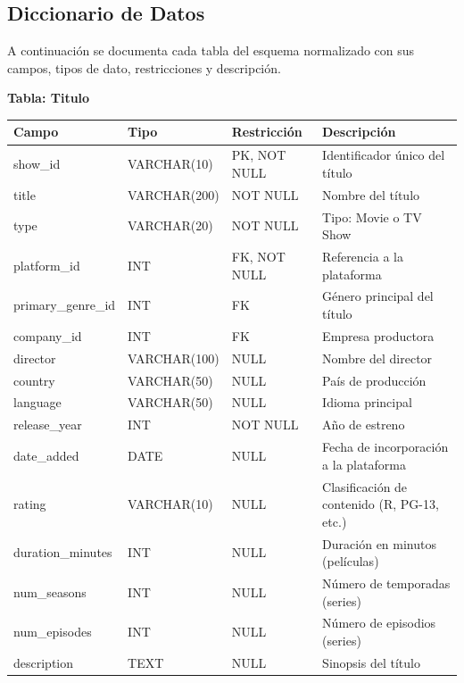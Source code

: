 \documentclass[12pt,a4paper]{article}
\begin{document}
\newpage
\subsection*{Diccionario de Datos}

A continuaci\'on se documenta cada tabla del esquema normalizado con sus campos, tipos de dato, restricciones y descripci\'on.

\vspace{0.4cm}

\textbf{Tabla: Titulo}

\vspace{0.2cm}
\begin{center}
\begin{tabular}{>{\ttfamily}p{3.8cm} p{2.8cm} p{2.5cm} p{5cm}}
\toprule
\normalfont Campo & Tipo & Restricci\'on & Descripci\'on \\
\midrule
show\_id    & VARCHAR(10)   & PK, NOT NULL  & Identificador \'unico del t\'itulo \\
title       & VARCHAR(200)  & NOT NULL      & Nombre del t\'itulo \\
type        & VARCHAR(20)   & NOT NULL      & Tipo: Movie o TV Show \\
platform\_id & INT          & FK, NOT NULL  & Referencia a la plataforma \\
primary\_genre\_id & INT    & FK            & G\'enero principal del t\'itulo \\
company\_id & INT           & FK            & Empresa productora \\
director    & VARCHAR(100)  & NULL          & Nombre del director \\
country     & VARCHAR(50)   & NULL          & Pa\'is de producci\'on \\
language    & VARCHAR(50)   & NULL          & Idioma principal \\
release\_year & INT         & NOT NULL      & A\~no de estreno \\
date\_added & DATE          & NULL          & Fecha de incorporaci\'on a la plataforma \\
rating      & VARCHAR(10)   & NULL          & Clasificaci\'on de contenido (R, PG-13, etc.) \\
duration\_minutes & INT     & NULL          & Duraci\'on en minutos (pel\'iculas) \\
num\_seasons & INT          & NULL          & N\'umero de temporadas (series) \\
num\_episodes & INT         & NULL          & N\'umero de episodios (series) \\
description & TEXT          & NULL          & Sinopsis del t\'itulo \\
\bottomrule
\end{tabular}
\end{center}
\end{document}
